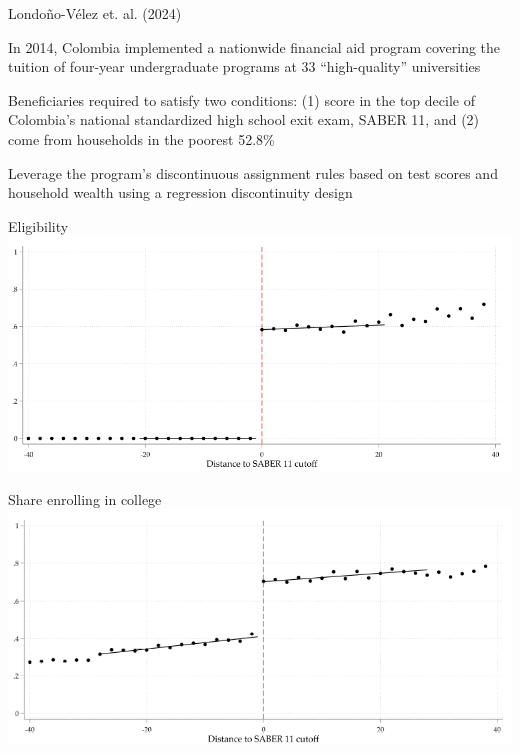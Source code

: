 \documentclass{./../div_teaching_slides}
\begin{document}
\begin{frame}{Londo\~{n}o-V\'{e}lez et. al. (2024)}
\begin{witemize}
  \item In 2014, Colombia implemented a nationwide financial aid program covering the tuition of four-year undergraduate programs at 33 ``high-quality'' universities
  \item Beneficiaries required to satisfy two conditions: (1) score in the top decile of Colombia’s national standardized high school exit exam, SABER 11, and (2) come from households in the poorest 52.8\%
  \item Leverage the program’s discontinuous assignment rules based
on test scores and household wealth using a regression discontinuity design
\end{witemize}

\end{frame}
\begin{frame}{Eligibility}
\includegraphics[scale=0.475]{rd1.png}
\end{frame}

\begin{frame}{Share enrolling in college}
\includegraphics[scale=0.55]{rd2.png}
\end{frame}
\end{document}
